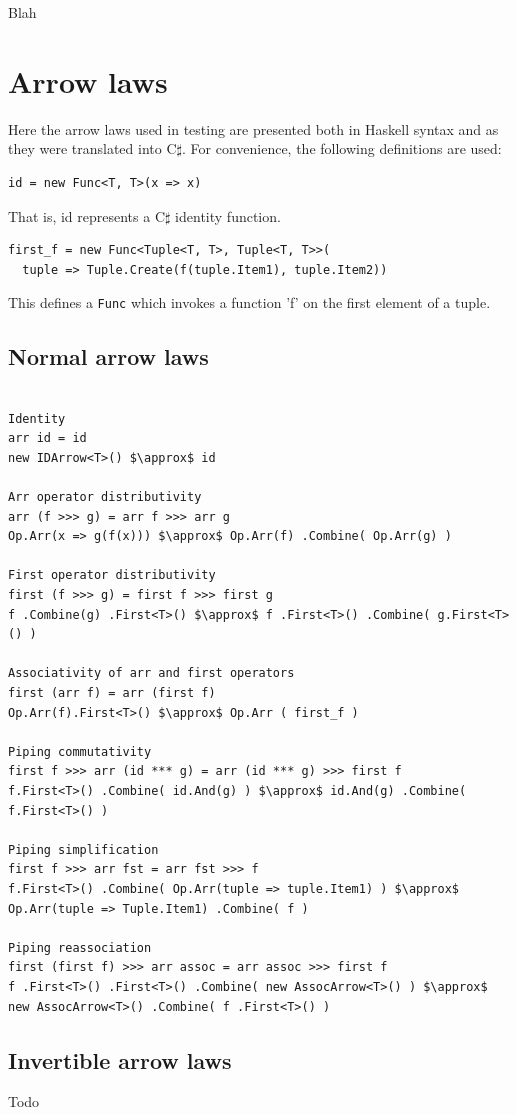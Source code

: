 \documentclass[12pt,twoside,notitlepage]{report}
\begin{document}
Blah

\cleardoublepage



\appendix

\chapter{Arrow laws} \label{sec:arrow_laws}

Here the arrow laws used in testing are presented both in Haskell syntax and as they were translated into C$\sharp$. For convenience, the following definitions are used:

\begin{lstlisting}
id = new Func<T, T>(x => x)
\end{lstlisting}

That is, id represents a C$\sharp$ identity function.

\begin{lstlisting}
first_f = new Func<Tuple<T, T>, Tuple<T, T>>(
  tuple => Tuple.Create(f(tuple.Item1), tuple.Item2))
\end{lstlisting}

This defines a \texttt{Func} which invokes a function 'f' on the first element of a tuple.

\section{Normal arrow laws} \label{sec:simle_arrow_laws}

\begin{samepage}
\begin{lstlisting}[mathescape]

Identity
arr id = id
new IDArrow<T>() $\approx$ id

Arr operator distributivity
arr (f >>> g) = arr f >>> arr g
Op.Arr(x => g(f(x))) $\approx$ Op.Arr(f) .Combine( Op.Arr(g) )

First operator distributivity
first (f >>> g) = first f >>> first g
f .Combine(g) .First<T>() $\approx$ f .First<T>() .Combine( g.First<T>() )

Associativity of arr and first operators
first (arr f) = arr (first f)
Op.Arr(f).First<T>() $\approx$ Op.Arr ( first_f )

Piping commutativity
first f >>> arr (id *** g) = arr (id *** g) >>> first f
f.First<T>() .Combine( id.And(g) ) $\approx$ id.And(g) .Combine( f.First<T>() )

Piping simplification
first f >>> arr fst = arr fst >>> f
f.First<T>() .Combine( Op.Arr(tuple => tuple.Item1) ) $\approx$ Op.Arr(tuple => Tuple.Item1) .Combine( f )

Piping reassociation
first (first f) >>> arr assoc = arr assoc >>> first f
f .First<T>() .First<T>() .Combine( new AssocArrow<T>() ) $\approx$ new AssocArrow<T>() .Combine( f .First<T>() )

\end{lstlisting}
\end{samepage}

\section{Invertible arrow laws} \label{sec:invertible_arrow_laws}

Todo

\cleardoublepage
\end{document}
